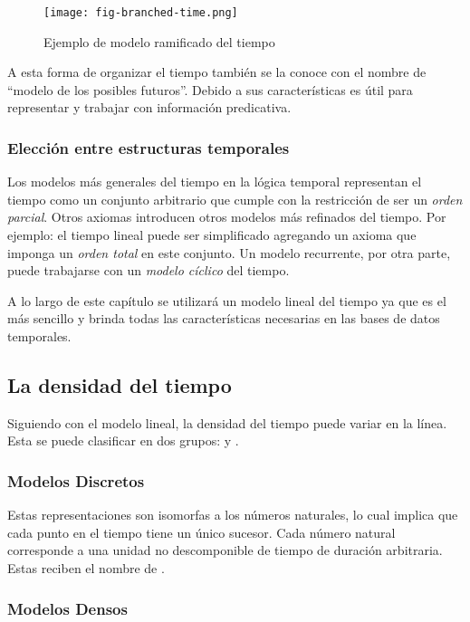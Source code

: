 \begin{figure}
    \centering
    \texttt{[image: fig-branched-time.png]}
    \caption{Ejemplo de modelo ramificado del tiempo}
    \label{fig:branched-time-model}
\end{figure}

A esta forma de organizar el tiempo también se la conoce con el nombre de “modelo de los posibles futuros”.
Debido a sus características es útil para representar y trabajar con información predicativa.

\subsubsection{Elección entre estructuras temporales}

Los modelos más generales del tiempo en la lógica temporal representan el tiempo como un conjunto arbitrario
que cumple con la restricción de ser un \textit{orden parcial}.
Otros axiomas introducen otros modelos más refinados del tiempo.
Por ejemplo: el tiempo lineal puede ser simplificado agregando un axioma que imponga un \textit{orden total} en este conjunto.
Un modelo recurrente, por otra parte, puede trabajarse con un \textit{modelo cíclico} del tiempo.

A lo largo de este capítulo se utilizará un modelo lineal del tiempo ya que es el más sencillo
y brinda todas las características necesarias en las bases de datos temporales.

\subsection{La densidad del tiempo}

Siguiendo con el modelo lineal, la densidad del tiempo puede variar en la línea.
Esta se puede clasificar en dos grupos:  y .

\subsubsection{Modelos Discretos}

Estas representaciones son isomorfas a los números naturales, lo cual implica que cada punto en el tiempo tiene un único sucesor.
Cada número natural corresponde a una unidad no descomponible de tiempo de duración arbitraria.
Estas reciben el nombre de .

\subsubsection{Modelos Densos}

